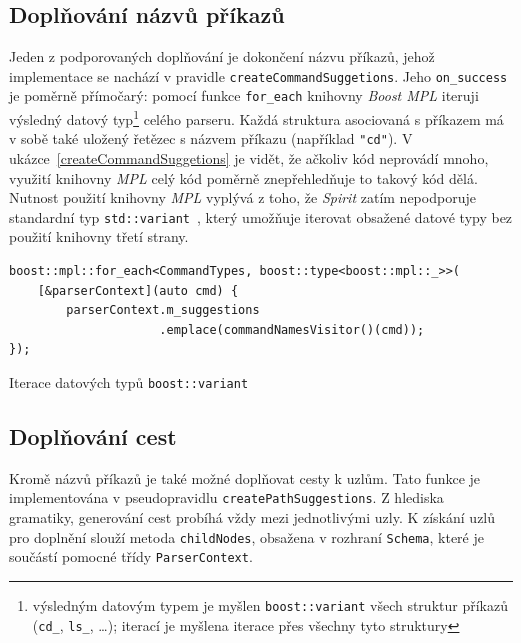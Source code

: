 \documentclass[thesis=B,czech,hidelinks]{FITthesis}[2019/03/06]
\begin{document}
\subsection{Doplňování názvů příkazů}\label{completing:commands}
Jeden z podporovaných doplňování je dokončení názvu příkazů, jehož implementace se nachází v pravidle \texttt{createCommandSuggetions}. Jeho \texttt{on\_success} je poměrně přímočarý: pomocí funkce \texttt{for\_each} knihovny \textit{Boost MPL}\cite{boost:mpl} iteruji výsledný datový typ\footnote{výsledným datovým typem je myšlen \texttt{boost::variant} všech struktur příkazů (\texttt{cd\_}, \texttt{ls\_}, \ldots); iterací je myšlena iterace přes všechny tyto struktury} celého parseru. Každá struktura asociovaná s příkazem má v sobě také uložený řetězec s názvem příkazu (například \verb¨"cd"¨). V ukázce~\ref{createCommandSuggetions} je vidět, že ačkoliv kód neprovádí mnoho, využití knihovny \textit{MPL} celý kód poměrně znepřehledňuje to takový kód dělá. Nutnost použití knihovny \textit{MPL} vyplývá z toho, že \textit{Spirit} zatím nepodporuje standardní typ \texttt{std::variant}~\cite{boost-variant}, který umožňuje iterovat obsažené datové typy bez použití knihovny třetí strany.

\begin{listing}
\begin{verbatim}
boost::mpl::for_each<CommandTypes, boost::type<boost::mpl::_>>(
    [&parserContext](auto cmd) {
        parserContext.m_suggestions
                     .emplace(commandNamesVisitor()(cmd));
});
\end{verbatim}
\caption{Iterace datových typů \texttt{boost::variant}}\label{createCommandSuggetions}
\end{listing}


\subsection{Doplňování cest}
Kromě názvů příkazů je také možné doplňovat cesty k uzlům. Tato funkce je implementována v pseudopravidlu \texttt{createPathSuggestions}. Z hlediska gramatiky, generování cest probíhá vždy mezi jednotlivými uzly. K získání uzlů pro doplnění slouží metoda \texttt{childNodes}, obsažena v rozhraní \texttt{Schema}, které je součástí pomocné třídy \texttt{ParserContext}.
\end{document}
